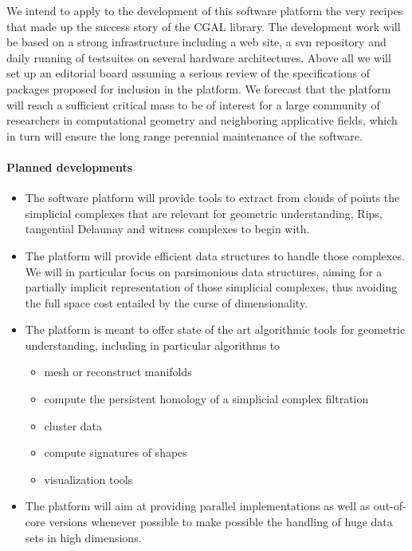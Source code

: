  We intend to apply to the development of this software platform 
the very  recipes that made up the success story
of the CGAL library. 
The development work will be based on a strong infrastructure
including a web site, a svn repository and  daily running of testsuites on several  hardware architectures.
Above all we will set up  an editorial board assuming a  serious review of the 
specifications of packages proposed for inclusion in the platform.
We forecast that the platform will reach a sufficient critical mass
to be of interest for a large community of researchers in
computational geometry and neighboring applicative fields,
which in turn will ensure the long range perennial maintenance
of the software.



\paragraph{Planned developments} 
\begin{itemize}
\item The software platform will provide tools to extract from clouds of points the
simplicial complexes that are relevant for geometric understanding,
Rips, tangential Delaunay  and witness complexes to begin with. 
\item The platform will provide efficient data structures to handle those
complexes. We will in particular  focus on parsimonious data
structures, aiming for a partially implicit representation of those simplicial
complexes, thus avoiding the full space cost entailed by the curse of
dimensionality. 
\item The platform is meant to offer state of the art algorithmic tools for geometric
understanding,
including in particular algorithms to
\begin{itemize}
\item  mesh or reconstruct manifolds
\item  compute the persistent homology of a simplicial complex filtration 
\item cluster data
\item compute signatures of shapes
\item visualization tools 
\end{itemize}
\item The platform will aim at providing parallel implementations as well
as out-of-core versions whenever possible to make possible the
handling of huge data sets in high dimensions.
\end{itemize}

